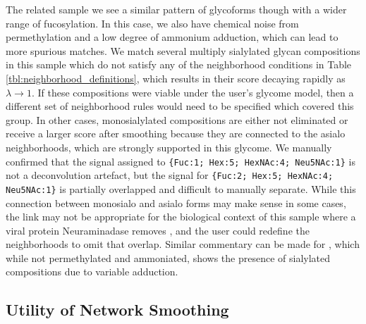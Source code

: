         The related \dpphil sample we see a similar pattern of glycoforms though with a wider range of
    fucosylation. In this case, we also have chemical noise from permethylation and a low degree of
    ammonium adduction, which can lead to more spurious matches. We match several multiply
    sialylated glycan compositions in this sample which do not satisfy any of the neighborhood conditions
    in Table \ref{tbl:neighborhood_definitions}, which results in their score decaying rapidly as $\lambda\rightarrow1$.
    If these compositions were viable under the user's glycome model, then a different set of neighborhood
    rules would need to be specified which covered this group. %
    In other cases, monosialylated compositions
    are either not eliminated or receive a larger score after smoothing because they are connected to the
    asialo neighborhoods, which are strongly supported in this glycome. We manually confirmed that the
    signal assigned to \texttt{\{{Fuc:1; Hex:5; HexNAc:4; Neu5NAc:1}\}} is not a deconvolution artefact,
    but the signal for \texttt{\{{Fuc:2; Hex:5; HexNAc:4; Neu5NAc:1}\}} is partially overlapped and 
    difficult to manually separate. While this connection between monosialo and asialo forms may make sense
    in some cases, the link may not be appropriate for the biological context of this sample where
    a viral protein Neuraminadase removes , and the user could redefine the
    neighborhoods to omit that overlap. Similar commentary can be made for \philbs, which while not
    permethylated and ammoniated, shows the presence of sialylated compositions due to variable adduction.

    \subsection{Utility of Network Smoothing}
